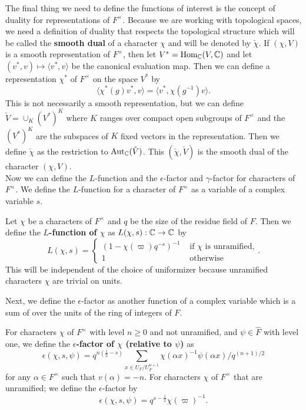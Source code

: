 The final thing we need to define the functions of interest is the concept of duality for representations of $F^\times$.
Because we are working with topological spaces, we need a definition of duality that respects the topological structure which will be called the \textbf{smooth dual} of a character $\chi$ and will be denoted by $\check{\chi}$.
If $(\chi, V)$ is a smooth representation of $F^\times$, then let $V^* = \textrm{Hom}_{\mathbb{C}}(V,\mathbb{C})$ and let $(v^* , v) \mapsto \langle v^*, v\rangle$ be the canonical evaluation map.
Then we can define a representation $\chi^*$ of $F^\times$ on the space $V^*$ by
\[\langle \chi^*(g)v^*, v\rangle = \langle v^* , \chi(g^{-1})v\rangle.\]
This is not necessarily a smooth representation, but we can define $\check{V} = \cup_K (V^*)^K$ where $K$ ranges over compact open subgroups of $F^\times$ and the $(V^*)^K$ are the subspaces of $K$ fixed vectors in the representation.
Then we define $\check{\chi}$ as the restriction to $\textrm{Aut}_{\mathbb{C}}(\check{V})$.
This $(\check{\chi},\check{V})$ is the smooth dual of the character $(\chi, V)$.
\\

Now we can define the $L$-function and the  $\epsilon$-factor and $\gamma$-factor for characters of $F^\times$.
We define the $L$-function for a character of $F^\times$ as a variable of a complex variable $s$.

\begin{defn}
  Let $\chi$ be a characters of $F^\times$ and $q$ be the size of the residue field of $F$. Then we define the \textbf{$L$-function of $\chi$} as $L(\chi, s) : \mathbb{C} \to \mathbb{C}$ by 
  \[L(\chi, s) = \begin{cases} (1 - \chi(\varpi) q^{-s})^{-1} & \text{ if } \chi \text{ is unramified,} \\ 1 & \text{ otherwise} \end{cases}.\]
  This will be independent of the choice of uniformizer because unramified characters $\chi$ are trivial on units.
\end{defn}

Next, we define the $\epsilon$-factor as another function of a complex variable which is a sum of over the units of the ring of integers of $F$.
\begin{defn}
  For characters $\chi$ of $F^\times$ with level $n \geq 0$ and not unramified, and $\psi \in \hat{F}$ with level one, we define the \textbf{$\epsilon$-factor of $\chi$ (relative to $\psi$)} as
  \[\epsilon(\chi, s, \psi) = q^{n(\frac{1}{2} - s)} \sum_{x \in U_F/U_F^{n+1}} \chi(\alpha x)^{-1} \psi(\alpha x)/q^{(n+1)/2}\]
  for any $\alpha \in F^\times$ such that $v(\alpha) = -n$.
  For characters $\chi$ of $F^\times$ that are unramified; we define the $\epsilon$-factor by
  \[\epsilon(\chi, s, \psi) = q^{s - \frac{1}{2}} \chi(\varpi)^{-1}.\]
\end{defn}

